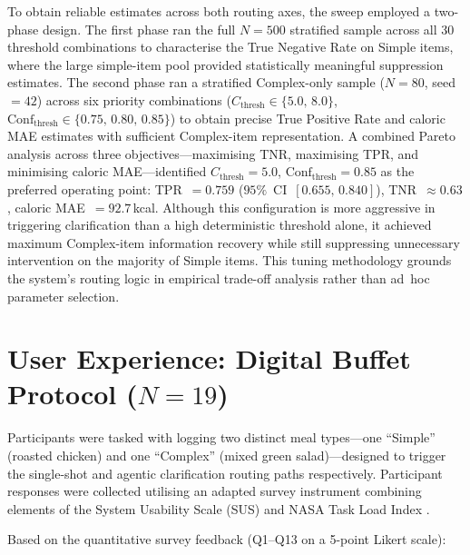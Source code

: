 To obtain reliable estimates across both routing axes, the sweep employed a two-phase design. The first phase ran the full $N=500$ stratified sample across all 30 threshold combinations to characterise the True Negative Rate on Simple items, where the large simple-item pool provided statistically meaningful suppression estimates. The second phase ran a stratified Complex-only sample ($N=80$, seed~$=42$) across six priority combinations ($C_{\text{thresh}} \in \{5.0,\, 8.0\}$, $\text{Conf}_{\text{thresh}} \in \{0.75,\, 0.80,\, 0.85\}$) to obtain precise True Positive Rate and caloric MAE estimates with sufficient Complex-item representation. A combined Pareto analysis across three objectives---maximising TNR, maximising TPR, and minimising caloric MAE---identified $C_{\text{thresh}} = 5.0$, $\text{Conf}_{\text{thresh}} = 0.85$ as the preferred operating point: TPR~$= 0.759$ ($95\%$~CI~$[0.655,\, 0.840]$), TNR~$\approx 0.63$, caloric MAE~$= 92.7\,$kcal. Although this configuration is more aggressive in triggering clarification than a high deterministic threshold alone, it achieved maximum Complex-item information recovery while still suppressing unnecessary intervention on the majority of Simple items. This tuning methodology grounds the system's routing logic in empirical trade-off analysis rather than ad~hoc parameter selection.

\section{User Experience: Digital Buffet Protocol ($N=19$)}
\label{sec:digital-buffet}

Participants were tasked with logging two distinct meal types---one ``Simple'' (roasted chicken) and one ``Complex'' (mixed green salad)---designed to trigger the single-shot and agentic clarification routing paths respectively. Participant responses were collected utilising an adapted survey instrument combining elements of the System Usability Scale (SUS) and NASA Task Load Index \citep{hartDevelopmentNASATLXTask1988}.

Based on the quantitative survey feedback (Q1--Q13 on a 5-point Likert scale):

